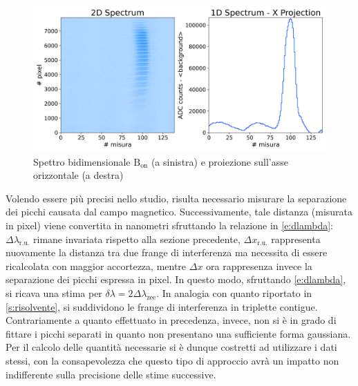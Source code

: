 \documentclass[twocolumn,10pt]{asme2ej}
\begin{document}
\begin{figure}
    \centering
    \includegraphics[width=\linewidth]{../Plots/Bon_2d_spectrum.png}
    \caption{Spettro bidimensionale $\text{B}_{\text{on}}$ (a sinistra) e proiezione sull'asse orizzontale (a destra)}
    \label{i:spettro2d_Bon}
    \vspace{-10pt}
\end{figure}

\noindent Volendo essere più precisi nello studio, risulta necessario misurare la separazione dei picchi causata dal
campo magnetico. Successivamente, tale distanza (misurata in pixel) viene convertita in nanometri sfruttando la
relazione in \autoref{e:dlambda}: $\Delta\lambda_{\text{r.u.}}$ rimane invariata rispetto alla sezione precedente,
$\Delta x_{\text{r.u.}}$ rappresenta nuovamente la distanza tra due frange di interferenza ma necessita di essere
ricalcolata con maggior accortezza, mentre $\Delta x$ ora rappresenza invece la separazione dei picchi espressa in
pixel. In questo modo, sfruttando \autoref{e:dlambda}, si ricava una stima per $\delta\lambda = 2
\Delta\lambda_{\text{zee}}$. In analogia con quanto riportato in \autoref{s:risolvente}, si suddividono le frange di
interferenza in triplette contigue. Contrariamente a quanto effettuato in precedenza, invece, non si è in grado di
fittare i picchi separati in quanto non presentano una sufficiente forma gaussiana. Per il calcolo delle quantità
necessarie si è dunque costretti ad utilizzare i dati stessi, con la consapevolezza che questo tipo di approccio avrà un
impatto non indifferente sulla precisione delle stime successive.
\end{document}
